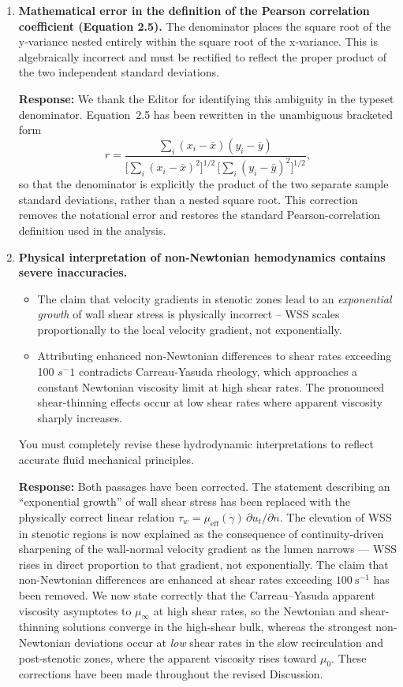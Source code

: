 \documentclass[11pt]{article}
\begin{document}
\begin{enumerate}[label=\textbf{\arabic*.}, leftmargin=*, resume]
\item \textbf{Mathematical error in the definition of the Pearson correlation coefficient (Equation 2.5).}
  The denominator places the square root of the y‑variance nested entirely within the square root of the x‑variance. This is algebraically incorrect and must be rectified to reflect the proper product of the two independent standard deviations.

  \textbf{Response:} We thank the Editor for identifying this ambiguity in the typeset denominator. Equation~2.5 has been rewritten in the unambiguous bracketed form
  \[
  r=\frac{\sum_i(x_i-\bar x)(y_i-\bar y)}{\bigl[\sum_i(x_i-\bar x)^2\bigr]^{1/2}\,\bigl[\sum_i(y_i-\bar y)^2\bigr]^{1/2}},
  \]
  so that the denominator is explicitly the product of the two separate sample standard deviations, rather than a nested square root. This correction removes the notational error and restores the standard Pearson-correlation definition used in the analysis.

\item \textbf{Physical interpretation of non‑Newtonian hemodynamics contains severe inaccuracies.}
  \begin{itemize}
    \item The claim that velocity gradients in stenotic zones lead to an \textit{exponential growth} of wall shear stress is physically incorrect – WSS scales proportionally to the local velocity gradient, not exponentially.
    \item Attributing enhanced non‑Newtonian differences to shear rates exceeding 100 $s^-1$ contradicts Carreau‑Yasuda rheology, which approaches a constant Newtonian viscosity limit at high shear rates. The pronounced shear‑thinning effects occur at low shear rates where apparent viscosity sharply increases.
  \end{itemize}
  You must completely revise these hydrodynamic interpretations to reflect accurate fluid mechanical principles.

  \textbf{Response:} Both passages have been corrected. The statement describing an ``exponential growth'' of wall shear stress has been replaced with the physically correct linear relation $\tau_w=\mu_{\mathrm{eff}}(\dot\gamma)\,\partial u_t/\partial n$. The elevation of WSS in stenotic regions is now explained as the consequence of continuity-driven sharpening of the wall-normal velocity gradient as the lumen narrows --- WSS rises in direct proportion to that gradient, not exponentially. The claim that non-Newtonian differences are enhanced at shear rates exceeding $100~\mathrm{s}^{-1}$ has been removed. We now state correctly that the Carreau--Yasuda apparent viscosity asymptotes to $\mu_\infty$ at high shear rates, so the Newtonian and shear-thinning solutions converge in the high-shear bulk, whereas the strongest non-Newtonian deviations occur at \emph{low} shear rates in the slow recirculation and post-stenotic zones, where the apparent viscosity rises toward $\mu_0$. These corrections have been made throughout the revised Discussion.

\end{enumerate}
\end{document}
